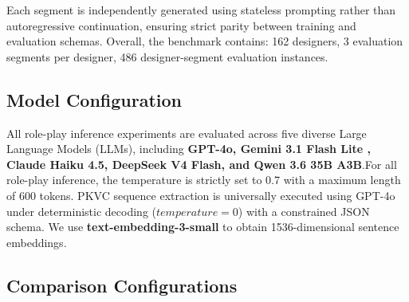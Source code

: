 \documentclass[11pt]{article}
\begin{document}
Each segment is independently generated using stateless prompting rather than autoregressive continuation, ensuring strict parity between training and evaluation schemas.
Overall, the benchmark contains: 162 designers, 3 evaluation segments per designer, 486 designer-segment evaluation instances.

\subsection{Model Configuration}
All role-play inference experiments are evaluated across five diverse Large Language Models (LLMs), including \textbf{GPT-4o, Gemini 3.1 Flash Lite , Claude Haiku 4.5, DeepSeek V4 Flash, and Qwen 3.6 35B A3B}.For all role-play inference, the temperature is strictly set to 0.7 with a maximum length of 600 tokens. PKVC sequence extraction is universally executed using GPT-4o under deterministic decoding ($temperature = 0$) with a constrained JSON schema.
We use \textbf{text-embedding-3-small} to obtain 1536-dimensional sentence embeddings.

\subsection{Comparison Configurations}
\end{document}
